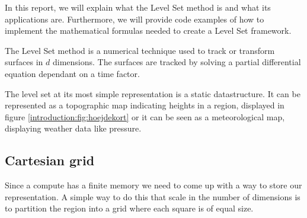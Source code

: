 In this report, we will explain what the Level Set method is and what its applications are. Furthermore, we will provide code examples of how to implement the mathematical formulas needed to create a Level Set framework. 

The Level Set method is a numerical technique used to track or transform surfaces in $d$ dimensions. The surfaces are tracked by solving a partial differential equation dependant on a time factor. 

The level set at its most simple representation is a static datastructure. It can be represented as a topographic map indicating heights in a region, displayed in figure \vref{introduction:fig:hoejdekort} or it can be seen as a meteorological map, displaying weather data like pressure.



\subsection{Cartesian grid}

Since a compute has a finite memory we need to come up with a way to store our representation. A simple way to do this that scale in the number of dimensions is to partition the region into a grid where each square is of equal size.



